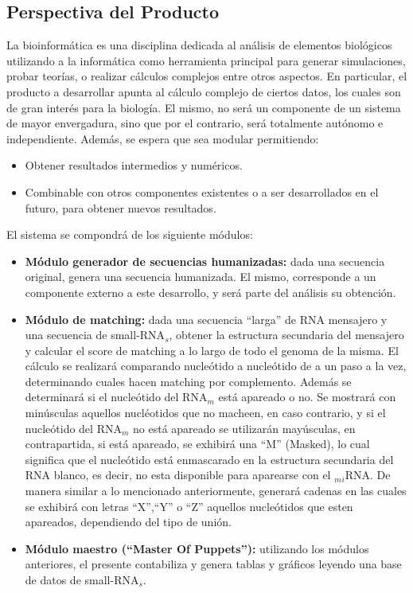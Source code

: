 \documentclass[12pt,a4paper,spanish]{article}
\begin{document}
\subsection{Perspectiva del Producto}
\par La bioinformática es una disciplina dedicada al análisis de elementos biológicos utilizando a la informática como herramienta principal para generar simulaciones, probar teorías, o realizar cálculos complejos entre otros aspectos. En particular, el producto a desarrollar apunta al cálculo complejo de ciertos datos, los cuales son de gran interés para la biología. El mismo, no será un componente de un sistema de mayor envergadura, sino que por el contrario, será totalmente autónomo e independiente. Además, se espera que sea modular permitiendo:
	\begin{itemize} 
		\item Obtener resultados intermedios y numéricos.
		\item Combinable con otros componentes existentes o a ser desarrollados en el futuro, para obtener nuevos resultados.
	\end{itemize}
\par El sistema se compondrá de los siguiente módulos:
	\begin{itemize}
		\item \textbf{Módulo generador de secuencias humanizadas:} dada una secuencia original, genera una secuencia humanizada. El mismo, corresponde a un componente externo a este desarrollo, y será parte del análisis su obtención.

		\item \textbf{Módulo de matching:} dada una secuencia “larga” de RNA mensajero y una secuencia de small-RNA$_s$, 			obtener la estructura secundaria del mensajero y calcular el score de matching a lo largo de todo el genoma de la 			misma. El cálculo se realizará comparando nucleótido a nucleótido de a un paso a la vez, determinando cuales hacen 			matching por complemento. Además se determinará si el nucleótido del RNA$_m$ está apareado o no.
		Se mostrará con minúsculas aquellos nucléotidos que no macheen, en caso contrario, y si el nucleótido del RNA$_m$ 			no está apareado se utilizarán mayúsculas, en contrapartida, si está apareado, se exhibirá una ``M'' (Masked), lo 			cual significa que el nucleótido está enmascarado en la estructura secundaria del RNA blanco, es decir, no esta 		disponible para aparearse con el $_m$$_i$RNA.
		De manera similar a lo mencionado anteriormente, generará cadenas en las cuales se exhibirá con letras ``X'',``Y'' 			o ``Z'' aquellos nucleótidos que esten apareados, dependiendo del tipo de unión.

		\item \textbf{Módulo maestro (“Master Of Puppets”):} utilizando los módulos anteriores, el presente contabiliza y 			genera tablas y gráficos leyendo una base de datos de small-RNA$_s$. 
	\end{itemize}
\end{document}
